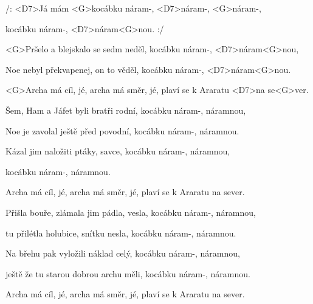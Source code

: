 

\zr
/: <D7>Já mám <G>kocábku náram-, <D7>náram-, <G>náram-,

kocábku náram-, <D7>náram<G>nou. :/
\kr

\zs
<G>Pršelo a blejskalo se sedm neděl,
kocábku náram-, <D7>náram<G>nou,

Noe nebyl překvapenej, on to věděl,
kocábku náram-, <D7>náram<G>nou.
\ks

\zr \kr

\zr
<G>Archa má cíl, jé, archa má směr, jé,
plaví se k Araratu <D7>na se<G>ver.
\kr

\zr \kr

\zs
Šem, Ham a Jáfet byli bratři rodní,
kocábku náram-, náramnou,

Noe je zavolal ještě před povodní,
kocábku náram-, náramnou.
\ks

\zs
Kázal jim naložiti ptáky, savce,
kocábku náram-, náramnou,

kocábku náram-, náramnou.
\ks

\zr \kr

\zr
Archa má cíl, jé, archa má směr, jé,
plaví se k Araratu na sever.
\kr

\zr \kr

\zs
Přišla bouře, zlámala jim pádla, vesla,
kocábku náram-, náramnou,

tu přilétla holubice, snítku nesla,
kocábku náram-, náramnou.
\ks

\zs
Na břehu pak vyložili náklad celý,
kocábku náram-, náramnou,

ještě že tu starou dobrou archu měli,
kocábku náram-, náramnou.
\ks

\zr \kr

\zr
Archa má cíl, jé, archa má směr, jé,
plaví se k Araratu na sever.
\kr

\zr \kr

\kp





